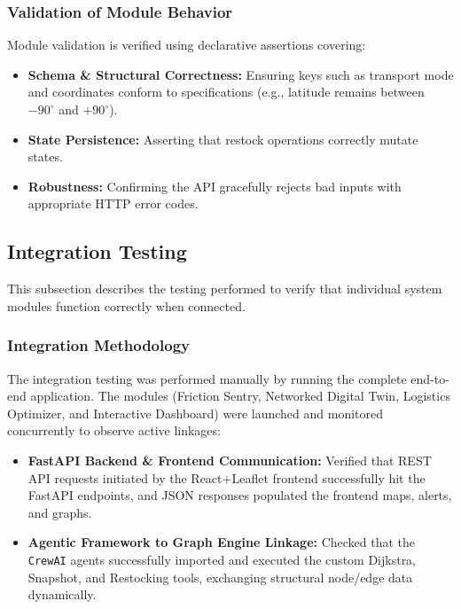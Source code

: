 \subsubsection{Validation of Module Behavior}
Module validation is verified using declarative assertions covering:
\begin{itemize}
    \item \textbf{Schema \& Structural Correctness:} Ensuring keys such as transport mode and coordinates conform to specifications (e.g., latitude remains between $-90^\circ$ and $+90^\circ$).
    \item \textbf{State Persistence:} Asserting that restock operations correctly mutate states.
    \item \textbf{Robustness:} Confirming the API gracefully rejects bad inputs with appropriate HTTP error codes.
\end{itemize}

\subsection[Integration Testing]{Integration Testing}
This subsection describes the testing performed to verify that individual system modules function correctly when connected.

\subsubsection{Integration Methodology}
The integration testing was performed manually by running the complete end-to-end application. The modules (Friction Sentry, Networked Digital Twin, Logistics Optimizer, and Interactive Dashboard) were launched and monitored concurrently to observe active linkages:
\begin{itemize}
    \item \textbf{FastAPI Backend \& Frontend Communication:} Verified that REST API requests initiated by the React+Leaflet frontend successfully hit the FastAPI endpoints, and JSON responses populated the frontend maps, alerts, and graphs.
    \item \textbf{Agentic Framework to Graph Engine Linkage:} Checked that the \texttt{CrewAI} agents successfully imported and executed the custom Dijkstra, Snapshot, and Restocking tools, exchanging structural node/edge data dynamically.
\end{itemize}

